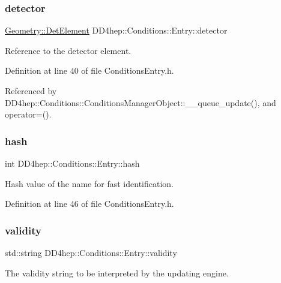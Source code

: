 \subsubsection{\texorpdfstring{detector}{detector}}
{\footnotesize\ttfamily \hyperlink{class_d_d4hep_1_1_geometry_1_1_det_element}{Geometry\+::\+Det\+Element} D\+D4hep\+::\+Conditions\+::\+Entry\+::detector}



Reference to the detector element. 



Definition at line 40 of file Conditions\+Entry.\+h.



Referenced by D\+D4hep\+::\+Conditions\+::\+Conditions\+Manager\+Object\+::\+\_\+\+\_\+queue\+\_\+update(), and operator=().

\hypertarget{class_d_d4hep_1_1_conditions_1_1_entry_a7f213cb001c089b5aa3ed890aa1f05b5}{}\label{class_d_d4hep_1_1_conditions_1_1_entry_a7f213cb001c089b5aa3ed890aa1f05b5} 
\subsubsection{\texorpdfstring{hash}{hash}}
{\footnotesize\ttfamily int D\+D4hep\+::\+Conditions\+::\+Entry\+::hash}



Hash value of the name for fast identification. 



Definition at line 46 of file Conditions\+Entry.\+h.

\hypertarget{class_d_d4hep_1_1_conditions_1_1_entry_a9a559618af3b8d15be51c806e40d1764}{}\label{class_d_d4hep_1_1_conditions_1_1_entry_a9a559618af3b8d15be51c806e40d1764} 
\subsubsection{\texorpdfstring{validity}{validity}}
{\footnotesize\ttfamily std\+::string D\+D4hep\+::\+Conditions\+::\+Entry\+::validity}



The validity string to be interpreted by the updating engine. 



